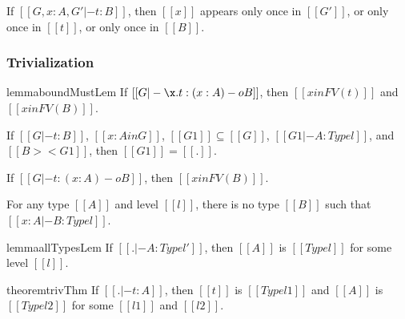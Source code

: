 \begin{corollary}
  \label{corollary:linearity}
  If $[[G,x : A,G' |- t : B]]$, then $[[x]]$ appears only once in
  $[[G']]$, or only once in $[[t]]$, or only once in $[[B]]$.
\end{corollary}

\subsubsection{Trivialization}
\label{subsec:trivialization}

\begin{restatable}{lemma}{boundMustLem}
  \label{lemma:lambda-bound_variables_must_be_used}
  If $[[G |- \x.t : (x : A) -o B]]$, then $[[x in FV(t)]]$ and $[[x in FV(B)]]$.
\end{restatable}

\begin{lemma}
  \label{lemma:closed_ctxs}
  If $[[G |- t : B]]$, $[[x : A in G]]$, $[[G1]] \subseteq [[G]]$, $[[G1 |- A : Type l]]$, and $[[B >< G1]]$,
  then $[[G1]] = [[.]]$.
\end{lemma}

\begin{lemma}
  \label{lemma:arrow_bound_variables_must_be_used}
  If $[[G |- t : (x : A) -o B]]$, then $[[x in FV(B)]]$.
\end{lemma}

\begin{lemma}
  \label{lemma:no_type_dependency}
  For any type $[[A]]$ and level $[[l]]$, there is no type $[[B]]$ such that
  $[[x : A |- B : Type l]]$.
\end{lemma}

\begin{restatable}{lemma}{allTypesLem}
  \label{lemma:all_types_are_type}
  If $[[. |- A : Type l']]$, then $[[A]]$ is $[[Type l]]$ for some level $[[l]]$.
\end{restatable}

\begin{restatable}[Trivialization]{theorem}{trivThm}
  \label{theorem:trivalization}
  If $[[. |- t : A]]$, then $[[t]]$ is $[[Type l1]]$ and $[[A]]$ is
  $[[Type l2]]$ for some $[[l1]]$ and $[[l2]]$.
\end{restatable}


